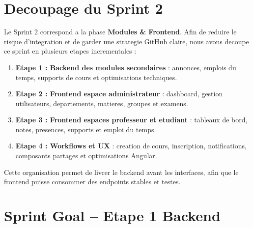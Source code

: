 \documentclass[12pt,a4paper]{report}
\begin{document}
\iffalse

\section{Decoupage du Sprint 2}

Le Sprint 2 correspond a la phase \textbf{Modules \& Frontend}. Afin de reduire le risque d'integration et de garder une strategie GitHub claire, nous avons decoupe ce sprint en plusieurs etapes incrementales :

\begin{enumerate}[itemsep=0.3em]
    \item \textbf{Etape 1 : Backend des modules secondaires} : annonces, emplois du temps, supports de cours et optimisations techniques.
    \item \textbf{Etape 2 : Frontend espace administrateur} : dashboard, gestion utilisateurs, departements, matieres, groupes et examens.
    \item \textbf{Etape 3 : Frontend espaces professeur et etudiant} : tableaux de bord, notes, presences, supports et emploi du temps.
    \item \textbf{Etape 4 : Workflows et UX} : creation de cours, inscription, notifications, composants partages et optimisations Angular.
\end{enumerate}

Cette organisation permet de livrer le backend avant les interfaces, afin que le frontend puisse consommer des endpoints stables et testes.

\section{Sprint Goal -- Etape 1 Backend}

\begin{center}
\end{center}
\end{document}
